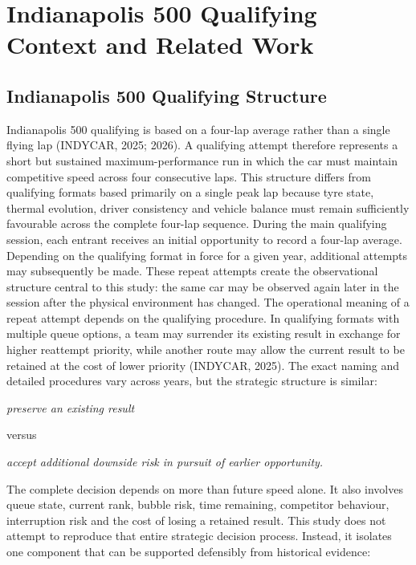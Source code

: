 \section{Indianapolis 500 Qualifying Context and Related Work}

\subsection{Indianapolis 500 Qualifying Structure}
Indianapolis 500 qualifying is based on a four-lap average rather than a single flying lap (INDYCAR, 2025; 2026). A qualifying attempt therefore represents a short but sustained maximum-performance run in which the car must maintain competitive speed across four consecutive laps. This structure differs from qualifying formats based primarily on a single peak lap because tyre state, thermal evolution, driver consistency and vehicle balance must remain sufficiently favourable across the complete four-lap sequence. During the main qualifying session, each entrant receives an initial opportunity to record a four-lap average. Depending on the qualifying format in force for a given year, additional attempts may subsequently be made. These repeat attempts create the observational structure central to this study: the same car may be observed again later in the session after the physical environment has changed. The operational meaning of a repeat attempt depends on the qualifying procedure. In qualifying formats with multiple queue options, a team may surrender its existing result in exchange for higher reattempt priority, while another route may allow the current result to be retained at the cost of lower priority (INDYCAR, 2025). The exact naming and detailed procedures vary across years, but the strategic structure is similar:

\begin{center}\textit{preserve an existing result}\end{center}

versus

\begin{center}\textit{accept additional downside risk in pursuit of earlier opportunity.}\end{center}

The complete decision depends on more than future speed alone. It also involves queue state, current rank, bubble risk, time remaining, competitor behaviour, interruption risk and the cost of losing a retained result. This study does not attempt to reproduce that entire strategic decision process. Instead, it isolates one component that can be supported defensibly from historical evidence:

